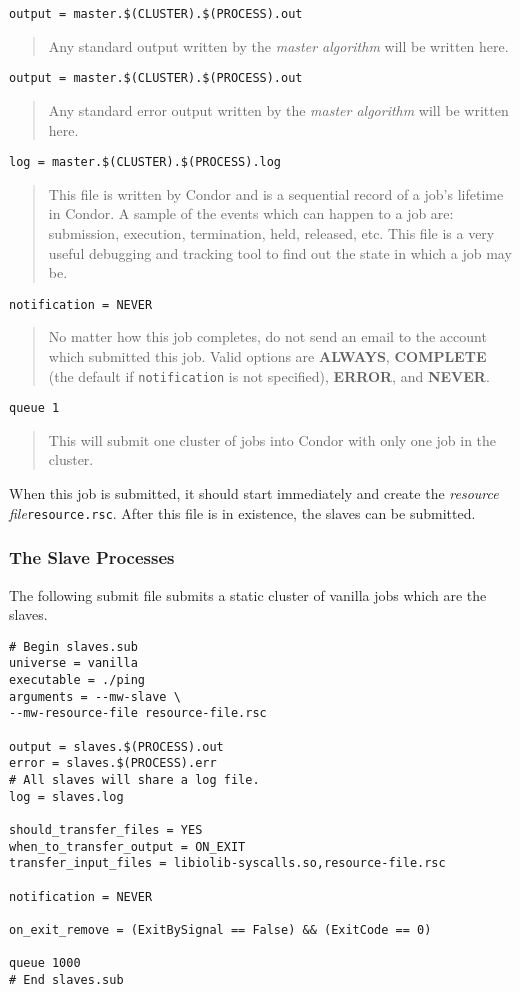 \documentclass[titlepage,12pt]{book}
\newcommand{\ma}{\textit{master algorithm}\xspace}
\newcommand{\rfile}{\textit{resource file}\xspace}
\newcommand{\file}[1]{\texttt{#1}\xspace}
\newcommand{\bold}[1]{\textbf{#1}\xspace}
\newenvironment{explainline}[1]
	{\noindent\texttt{#1}\begin{quotation}}
	{\end{quotation}}
\begin{document}
\begin{explainline}
{output = master.\$(CLUSTER).\$(PROCESS).out}
Any standard output written by the \ma will be written here.
\end{explainline}

\begin{explainline}
{output = master.\$(CLUSTER).\$(PROCESS).out}
Any standard error output written by the \ma will be written here.
\end{explainline}

\begin{explainline}
{log = master.\$(CLUSTER).\$(PROCESS).log}
This file is written by Condor and is a sequential record of a job's lifetime
in Condor. A sample of the events which can happen to a job are: submission,
execution, termination, held, released, etc. This file is a very useful
debugging and tracking tool to find out the state in which a job may be.
\end{explainline}

\begin{explainline}
{notification = NEVER}
No matter how this job completes, do not send an email to the
account which submitted this job. Valid options are \bold{ALWAYS},
\bold{COMPLETE} (the default if \texttt{notification} is not
specified), \bold{ERROR}, and \bold{NEVER}.
\end{explainline}

\begin{explainline}
{queue 1}
This will submit one cluster of jobs into Condor with only one job in the
cluster.
\end{explainline}

When this job is submitted, it should start immediately and create
the \rfile \file{resource.rsc}. After this file is in existence,
the slaves can be submitted.

\subsubsection{The Slave Processes}

The following submit file submits a static cluster of vanilla jobs
which are the slaves.

\begin{verbatim}
# Begin slaves.sub
universe = vanilla
executable = ./ping
arguments = --mw-slave \
--mw-resource-file resource-file.rsc

output = slaves.$(PROCESS).out
error = slaves.$(PROCESS).err
# All slaves will share a log file.
log = slaves.log

should_transfer_files = YES
when_to_transfer_output = ON_EXIT
transfer_input_files = libiolib-syscalls.so,resource-file.rsc

notification = NEVER

on_exit_remove = (ExitBySignal == False) && (ExitCode == 0)

queue 1000
# End slaves.sub
\end{verbatim}
\end{document}
